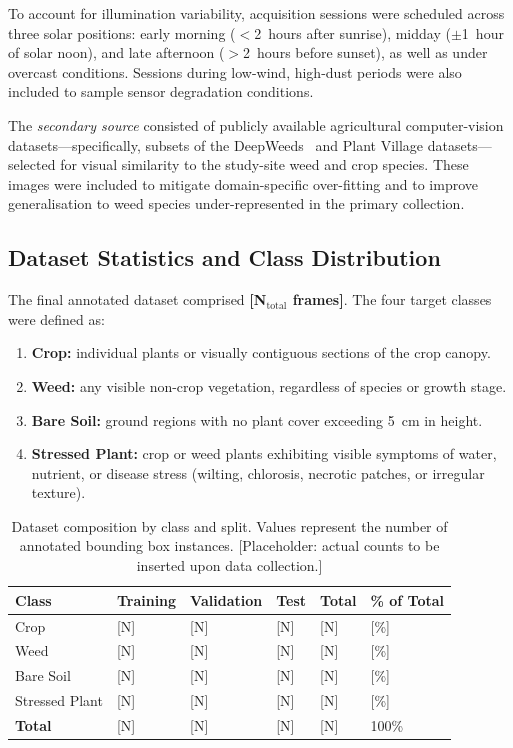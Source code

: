 \documentclass[12pt,a4paper]{report}
\renewcommand{\arraystretch}{1.3}
\begin{document}
To account for illumination variability, acquisition sessions were scheduled across three solar positions: early morning ($<$2~hours after sunrise), midday ($\pm$1~hour of solar noon), and late afternoon ($>$2~hours before sunset), as well as under overcast conditions. Sessions during low-wind, high-dust periods were also included to sample sensor degradation conditions.

The \emph{secondary source} consisted of publicly available agricultural computer-vision datasets---specifically, subsets of the DeepWeeds~\cite{Olsen2019} and Plant Village datasets---selected for visual similarity to the study-site weed and crop species. These images were included to mitigate domain-specific over-fitting and to improve generalisation to weed species under-represented in the primary collection.

\subsection{Dataset Statistics and Class Distribution}

The final annotated dataset comprised \textbf{[N$_\text{total}$ frames]}. The four target classes were defined as:
\begin{enumerate}
    \item \textbf{Crop:} individual plants or visually contiguous sections of the crop canopy.
    \item \textbf{Weed:} any visible non-crop vegetation, regardless of species or growth stage.
    \item \textbf{Bare Soil:} ground regions with no plant cover exceeding 5~cm in height.
    \item \textbf{Stressed Plant:} crop or weed plants exhibiting visible symptoms of water, nutrient, or disease stress (wilting, chlorosis, necrotic patches, or irregular texture).
\end{enumerate}

\begin{table}[H]
\centering
\small
\caption{Dataset composition by class and split. Values represent the number of annotated bounding box instances. [Placeholder: actual counts to be inserted upon data collection.]}
\label{tab:dataset}
\setlength{\tabcolsep}{4pt}
\renewcommand{\arraystretch}{1.3}
\begin{tabular}{|P{0.18\textwidth}|C{0.14\textwidth}|C{0.14\textwidth}|C{0.14\textwidth}|C{0.14\textwidth}|C{0.14\textwidth}|}
\hline
{}
\textbf{Class} & \textbf{Training} & \textbf{Validation} & \textbf{Test} & \textbf{Total} & \textbf{\% of Total} \\
\hline
Crop & [N] & [N] & [N] & [N] & [\%] \\
\hline
{}
Weed & [N] & [N] & [N] & [N] & [\%] \\
\hline
Bare Soil & [N] & [N] & [N] & [N] & [\%] \\
\hline
{}
Stressed Plant & [N] & [N] & [N] & [N] & [\%] \\
\hline
\textbf{Total} & [N] & [N] & [N] & [N] & 100\% \\
\hline
\end{tabular}
\end{table}
\end{document}
